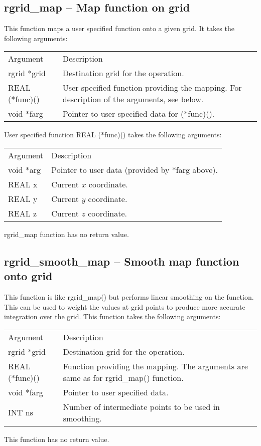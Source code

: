 \documentclass[12pt,letterpaper]{report}
\begin{document}
\subsection{rgrid\_map -- Map function on grid}

This function maps a user specified function onto a given grid. It takes the following arguments:
\begin{longtable}{p{} p{}}
Argument & Description\\
\cline{1-2}
rgrid *grid & Destination grid for the operation.\\
REAL (*func)() & User specified function providing the mapping. For description of the arguments, see below.\\
void *farg & Pointer to user specified data for (*func)().\\
\end{longtable}
User specified function REAL (*func)() takes the following arguments:
\begin{longtable}{p{} p{}}
Argument & Description\\
\cline{1-2}
void *arg & Pointer to user data (provided by *farg above).\\
REAL x & Current $x$ coordinate.\\
REAL y & Current $y$ coordinate.\\
REAL z & Current $z$ coordinate.\\
\end{longtable}
\noindent
rgrid\_map function has no return value.

\subsection{rgrid\_smooth\_map -- Smooth map function onto grid}

This function is like rgrid\_map() but performs linear smoothing on the function. This can be used to weight the values at grid points to produce more accurate integration over the grid. This function takes the following arguments:
\begin{longtable}{p{} p{}}
Argument & Description\\
\cline{1-2}
rgrid *grid & Destination grid for the operation.\\
REAL (*func)() & Function providing the mapping. The arguments are same as for rgrid\_map() function.\\
void *farg & Pointer to user specified data.\\
INT ns & Number of intermediate points to be used in smoothing.\\
\end{longtable}
\noindent
This function has no return value.
\end{document}
